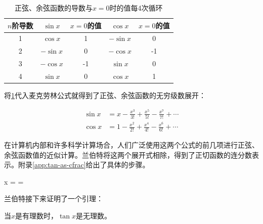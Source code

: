 \documentclass[b5paper]{ctexart}
\begin{document}
\begin{table}
  \centering
  \begin{tabular}{|c|c|c||c|c|}
    \hline
    $n$阶导数 & $\sin x$ & $x = 0$的值 & $\cos x$ & $x = 0$的值 \\
    \hline
    1 & $\cos x$  & 1  & $-\sin x$ & 0 \\
    \hline
    2 & $-\sin x$ & 0  & $-\cos x$ & -1 \\
    \hline
    3 & $-\cos x$ & -1 & $\sin x$  & 0 \\
    \hline
    4 & $\sin x$  & 0  & $\cos x$  & 1 \\
    \hline
  \end{tabular}
  \caption{正弦、余弦函数的导数与$x = 0$时的值每4次循环\label{tab:sin-cos-derivatives}}
\end{table}

将\cref{tab:sin-cos-derivatives}代入麦克劳林公式就得到了正弦、余弦函数的无穷级数展开：

\begin{align}
\sin x &= x - \frac{x^3}{3!} + \frac{x^5}{5!} - \frac{x^7}{7!} + \dotsb \\
\cos x &= 1 - \frac{x^2}{2!} + \frac{x^4}{4!} - \frac{x^6}{6!} + \dotsb
\end{align}

在计算机内部和许多科学计算场合，人们广泛使用这两个公式的前几项进行正弦、余弦函数值的近似计算。兰伯特将这两个展开式相除，得到了正切函数的连分数表示。附录\ref{app:tan-as-cfrac}给出了具体的步骤。

\be
\tan x =  = 
\ee

兰伯特接下来证明了一个引理：

\begin{lemma}
当$x$是有理数时，$\tan x$是无理数。
\end{lemma}
\end{document}
